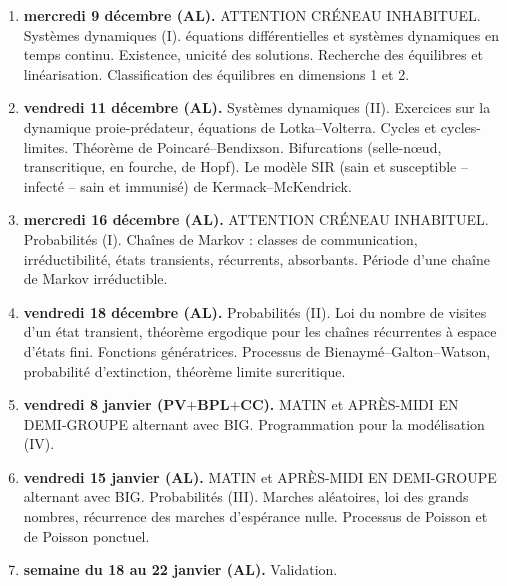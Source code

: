 \documentclass[11pt]{article}
\begin{document}
\begin{enumerate}
\bigskip


\item \textbf{mercredi 9 d\'ecembre (AL).} ATTENTION CR\'ENEAU INHABITUEL. Syst\`emes dynamiques (I). \'equations diff\'erentielles et syst\`emes dynamiques en temps continu. Existence, unicit\'e des solutions. Recherche des \'equilibres et lin\'earisation. Classification des \'equilibres en dimensions 1 et 2.


\bigskip



\item \textbf{vendredi 11 d\'ecembre (AL).} Syst\`emes dynamiques (II). Exercices sur la dynamique proie-pr\'edateur, \'equations de Lotka--Volterra. Cycles et cycles-limites. Th\'eor\`eme de Poincar\'e--Bendixson. Bifurcations (selle-n\oe ud, transcritique, en fourche, de Hopf). Le mod\`ele SIR (sain et susceptible -- infect\'e -- sain et immunis\'e) de Kermack--McKendrick.


\bigskip


\item \textbf{mercredi 16 d\'ecembre (AL).} ATTENTION CR\'ENEAU INHABITUEL. Probabilit\'es (I). Cha\^ines de Markov : classes de communication, irr\'eductibilit\'e, \'etats transients, r\'ecurrents, absorbants. P\'eriode d'une cha\^ine de Markov irr\'eductible.


\bigskip


\item \textbf{vendredi 18 d\'ecembre (AL).} Probabilit\'es (II). Loi du nombre de visites d'un \'etat transient, th\'eor\`eme ergodique pour les cha\^ines r\'ecurrentes \`a espace d'\'etats fini. Fonctions g\'en\'eratrices. Processus de Bienaym\'e--Galton--Watson, probabilit\'e d'extinction, th\'eor\`eme limite surcritique. 

\bigskip


\item \textbf{vendredi 8  janvier (PV$+$BPL$+$CC).} MATIN et APR\`ES-MIDI EN DEMI-GROUPE alternant avec BIG. Programmation pour la mod\'elisation (IV). 

\bigskip


 \item \textbf{vendredi 15 janvier (AL).} MATIN et APR\`ES-MIDI EN DEMI-GROUPE alternant avec BIG. Probabilit\'es (III). Marches al\'eatoires, loi des grands nombres, r\'ecurrence des marches d'esp\'erance nulle. Processus de Poisson et de Poisson ponctuel. %

\bigskip



 
\item \textbf{semaine du 18 au 22 janvier (AL).} Validation.

 
\end{enumerate} 
 
\end{document}
